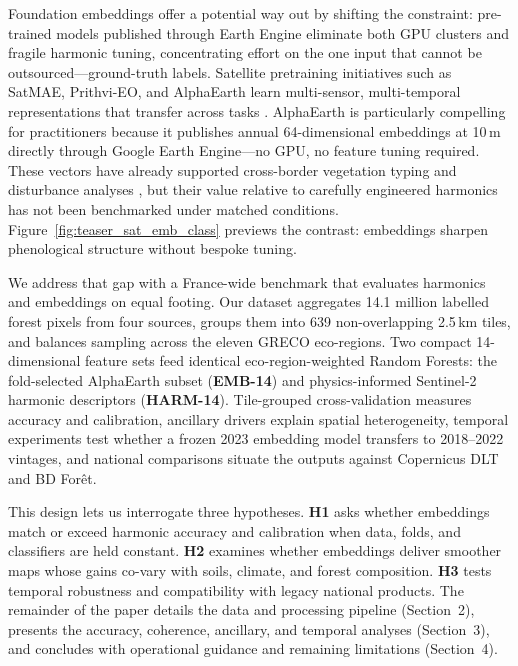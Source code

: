 \documentclass[utf8]{FrontiersinHarvard}
\begin{document}
Foundation embeddings offer a potential way out by shifting the constraint: pre-trained models published through Earth Engine eliminate both GPU clusters and fragile harmonic tuning, concentrating effort on the one input that cannot be outsourced—ground-truth labels. Satellite pretraining initiatives such as SatMAE, Prithvi-EO, and AlphaEarth learn multi-sensor, multi-temporal representations that transfer across tasks \citep{Cong2022,Szwarcman2024PrithviEO2,AlphaEarth2025}. AlphaEarth is particularly compelling for practitioners because it publishes annual 64-dimensional embeddings at 10\,m directly through Google Earth Engine—no GPU, no feature tuning required. These vectors have already supported cross-border vegetation typing and disturbance analyses \citep{Houriez2025AEFDataGen,Seydi2025AlphaEarthBurnedArea}, but their value relative to carefully engineered harmonics has not been benchmarked under matched conditions. Figure~\ref{fig:teaser_sat_emb_class} previews the contrast: embeddings sharpen phenological structure without bespoke tuning.

We address that gap with a France-wide benchmark that evaluates harmonics and embeddings on equal footing. Our dataset aggregates 14.1 million labelled forest pixels from four sources, groups them into 639 non-overlapping 2.5\,km tiles, and balances sampling across the eleven GRECO eco-regions. Two compact 14-dimensional feature sets feed identical eco-region-weighted Random Forests: the fold-selected AlphaEarth subset (\textbf{EMB-14}) and physics-informed Sentinel-2 harmonic descriptors (\textbf{HARM-14}). Tile-grouped cross-validation measures accuracy and calibration, ancillary drivers explain spatial heterogeneity, temporal experiments test whether a frozen 2023 embedding model transfers to 2018–2022 vintages, and national comparisons situate the outputs against Copernicus DLT and BD Forêt.

This design lets us interrogate three hypotheses. \textbf{H1} asks whether embeddings match or exceed harmonic accuracy and calibration when data, folds, and classifiers are held constant. \textbf{H2} examines whether embeddings deliver smoother maps whose gains co-vary with soils, climate, and forest composition. \textbf{H3} tests temporal robustness and compatibility with legacy national products. The remainder of the paper details the data and processing pipeline (Section~2), presents the accuracy, coherence, ancillary, and temporal analyses (Section~3), and concludes with operational guidance and remaining limitations (Section~4).
\end{document}
